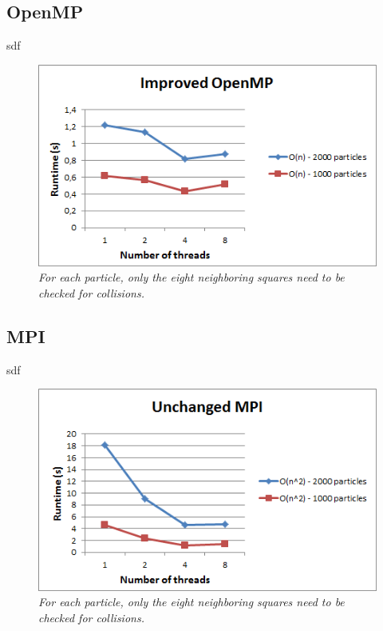 \documentclass[11pt,a4paper]{article}
\begin{document}
\subsection{OpenMP}
sdf
\begin{figure}[htb]
\centering
\includegraphics[scale=0.8]{pics/open1.png}
\caption{\emph{For each particle, only the eight neighboring squares need to be checked for collisions.}}
\label{fig:gird}
\end{figure}

\subsection{MPI}
sdf
\begin{figure}[htb]
\centering
\includegraphics[scale=0.8]{pics/mpi1.png}
\caption{\emph{For each particle, only the eight neighboring squares need to be checked for collisions.}}
\label{fig:gird}
\end{figure}
\end{document}
